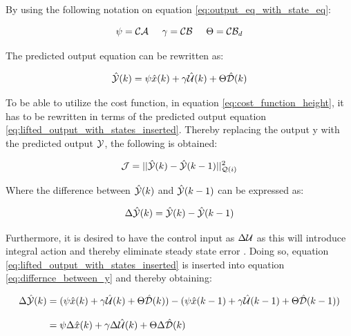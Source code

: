 By using the following notation on equation \ref{eq:output_eq_with_state_eq}:


\begin{equation}
 \psi = \CMcal{C}\CMcal{A}  \hspace{5mm} \gamma = \CMcal{C}\CMcal{B} \hspace{5mm}  \Theta = \CMcal{C}\CMcal{B}_{d}
\end{equation}

The predicted output equation can be rewritten as: 

\begin{equation}\label{eq:lifted_output_with_states_inserted}
	\hat{\CMcal{Y}}(k) = \psi \hat{x}(k) + \gamma \hat{\CMcal{U}}(k) + \Theta \hat{\CMcal{D}}(k)
\end{equation}



To be able to utilize the cost function, in equation \ref{eq:cost_function_height}, it has to be rewritten in terms of the predicted output equation \ref{eq:lifted_output_with_states_inserted}. Thereby replacing the output y with the predicted output $\CMcal{Y}$, the following is obtained:

\begin{equation}\label{eq:new_the_cost_function_yeah}
	\CMcal{J} = ||\hat{\CMcal{Y}}(k)-\hat{\CMcal{Y}}(k-1)||_{\CMcal{Q}(i)}^2
\end{equation}

Where the difference between $\hat{\CMcal{Y}}(k)$ and $\hat{\CMcal{Y}}(k-1)$ can be expressed as:

\begin{equation}\label{eq:differnce_between_y}
	\Delta \hat{\CMcal{Y}}(k) =\hat{\CMcal{Y}}(k)-\hat{\CMcal{Y}}(k-1) 
\end{equation}

Furthermore, it is desired to have the control input as $\Delta \CMcal{U}$ as this will introduce integral action and thereby eliminate steady state error \cite{maciejowski2002predictive}. Doing so, equation \ref{eq:lifted_output_with_states_inserted} is inserted into equation \ref{eq:differnce_between_y} and thereby obtaining:

\begin{equation}\label{eq:delta_output_eq} \begin{aligned}
	\Delta \hat{\CMcal{Y}}(k) &= (\psi \hat{x}(k) + \gamma \hat{\CMcal{U}}(k) + \Theta \hat{\CMcal{D}}(k))-(\psi \hat{x}(k-1) + \gamma \hat{\CMcal{U}}(k-1) + \Theta \hat{\CMcal{D}}(k-1)) \\[8pt]
							  &= \psi\Delta \hat{x}(k) + \gamma\Delta \hat{\CMcal{U}}(k) + \Theta\Delta \hat{\CMcal{D}}(k)
	\end{aligned}
\end{equation}


